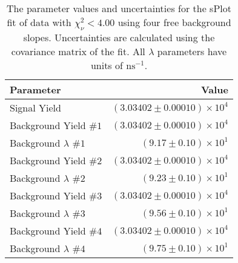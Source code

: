 
\begin{table}[ht]
    \begin{center}
        \begin{tabular}{lr}\toprule
            Parameter & Value \\\midrule
            Signal Yield & $(3.03402 \pm 0.00010) \times 10^{4}$ \\
            Background Yield $\#1$ & $(3.03402 \pm 0.00010) \times 10^{4}$ \\
            Background $\lambda$ $\#1$ & $(9.17 \pm 0.10) \times 10^{1}$ \\
            Background Yield $\#2$ & $(3.03402 \pm 0.00010) \times 10^{4}$ \\
            Background $\lambda$ $\#2$ & $(9.23 \pm 0.10) \times 10^{1}$ \\
            Background Yield $\#3$ & $(3.03402 \pm 0.00010) \times 10^{4}$ \\
            Background $\lambda$ $\#3$ & $(9.56 \pm 0.10) \times 10^{1}$ \\
            Background Yield $\#4$ & $(3.03402 \pm 0.00010) \times 10^{4}$ \\
            Background $\lambda$ $\#4$ & $(9.75 \pm 0.10) \times 10^{1}$ \\\bottomrule
        \end{tabular}
        \caption{The parameter values and uncertainties for the sPlot fit of data with $\chi^2_\nu < 4.00$ using four free background slopes. Uncertainties are calculated using the covariance matrix of the fit. All $\lambda$ parameters have units of $\si{\nano\second}^{-1}$.}\label{tab:splot-fit-results-chisqdof-4.00-free-4}
    \end{center}
\end{table}
